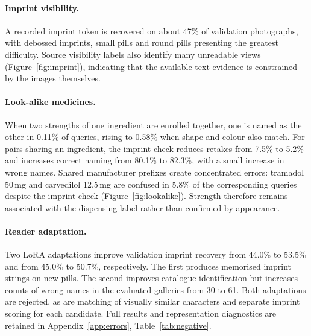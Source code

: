 \paragraph{Imprint visibility.} A recorded imprint token is recovered on about 47\% of validation photographs, with debossed imprints, small pills and round pills presenting the greatest difficulty. Source visibility labels also identify many unreadable views (Figure~\ref{fig:imprint}), indicating that the available text evidence is constrained by the images themselves.

\paragraph{Look-alike medicines.} When two strengths of one ingredient are enrolled together, one is named as the other in 0.11\% of queries, rising to 0.58\% when shape and colour also match. For pairs sharing an ingredient, the imprint check reduces retakes from 7.5\% to 5.2\% and increases correct naming from 80.1\% to 82.3\%, with a small increase in wrong names. Shared manufacturer prefixes create concentrated errors: tramadol 50\,mg and carvedilol 12.5\,mg are confused in 5.8\% of the corresponding queries despite the imprint check (Figure~\ref{fig:lookalike}). Strength therefore remains associated with the dispensing label rather than confirmed by appearance.

\paragraph{Reader adaptation.} Two LoRA adaptations improve validation imprint recovery from 44.0\% to 53.5\% and from 45.0\% to 50.7\%, respectively. The first produces memorised imprint strings on new pills. The second improves catalogue identification but increases counts of wrong names in the evaluated galleries from 30 to 61. Both adaptations are rejected, as are matching of visually similar characters and separate imprint scoring for each candidate. Full results and representation diagnostics are retained in Appendix~\ref{app:errors}, Table~\ref{tab:negative}.

